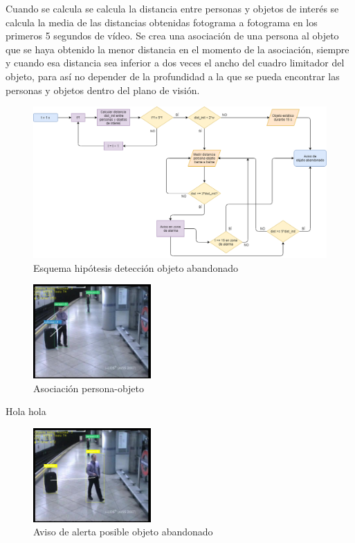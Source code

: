 Cuando se calcula se calcula la distancia entre personas y objetos de interés se calcula la media de las distancias obtenidas fotograma a fotograma en los primeros 5 segundos de vídeo. Se crea una asociación de una persona al objeto que se haya obtenido la menor distancia en el momento de la asociación, siempre y cuando esa distancia sea inferior a dos veces el ancho del cuadro limitador del objeto, para así no depender de la profundidad a la que se pueda encontrar las personas y objetos dentro del plano de visión.

\begin{figure}[ht]
\centering
\includegraphics[width=1\textwidth]{img/chapters/desarrollo/abandoned-object-scheme.png}
\caption{\label{fig:abandoned-object-scheme}Esquema hipótesis detección objeto abandonado}
\end{figure}

\newpage

\begin{figure}[ht]
\centering
\includegraphics[width=0.4\textwidth]{img/chapters/desarrollo/link-persona-objeto.jpg}
\caption{\label{fig:link-persona-objeto}Asociación persona-objeto}
\end{figure}

Hola hola

\begin{figure}[ht]
\centering
\includegraphics[width=0.4\textwidth]{img/chapters/desarrollo/warning-abandono.jpg}
\caption{\label{fig:warning-abandono}Aviso de alerta posible objeto abandonado}
\end{figure}

